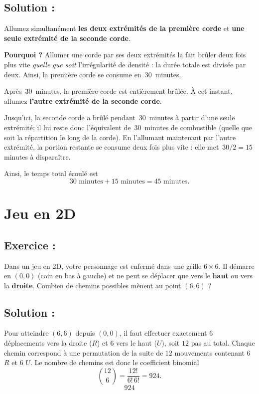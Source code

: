 \subsection*{Solution :}

Allumez simultanément \textbf{les deux extrémités de la première corde} et \textbf{une seule extrémité de la seconde corde}.  

\medskip
\noindent\textbf{Pourquoi ?}  
Allumer une corde par ses deux extrémités la fait brûler deux fois plus vite \emph{quelle que soit} l’irrégularité de densité : la durée totale est divisée par deux. Ainsi, la première corde se consume en \(\,30\,\) minutes.

\medskip
\noindent Après \(\,30\,\) minutes, la première corde est entièrement brûlée. À cet instant,
allumez \textbf{l’autre extrémité de la seconde corde}.  

Jusqu’ici, la seconde corde a brûlé pendant \(\,30\,\) minutes à partir d’une seule extrémité; il lui reste donc l’équivalent de \(\,30\,\) minutes de combustible (quelle que soit la répartition le long de la corde). En l’allumant maintenant par l’autre extrémité, la portion restante se consume deux fois plus vite : elle met \(\,30/2=15\,\) minutes à disparaître.

\medskip
\noindent Ainsi, le temps total écoulé est
\[
30 \text{ minutes} + 15 \text{ minutes} = \boxed{45 \text{ minutes}.}
\]


\section{Jeu en 2D}

\subsection*{Exercice :}

\begin{exerciseBox}[Jeu en 2D]
Dans un jeu en 2D, votre personnage est enfermé dans une grille \(6\times 6\).
Il démarre en \((0,0)\) (coin en bas à gauche) et ne peut se déplacer que vers le \textbf{haut}
ou vers la \textbf{droite}.  
Combien de chemins possibles mènent au point \((6,6)\) ?    
\end{exerciseBox}


\subsection*{Solution :}

Pour atteindre \((6,6)\) depuis \((0,0)\), il faut effectuer exactement
\(6\) déplacements vers la droite (\(R\)) et \(6\) vers le haut (\(U\)),
soit \(12\) pas au total.  
Chaque chemin correspond à une permutation de la suite de \(12\) mouvements
contenant \(6\) \(R\) et \(6\) \(U\).  
Le nombre de chemins est donc le coefficient binomial
\[
\binom{12}{6}=\frac{12!}{6!\,6!}=924.
\]
\[
\boxed{924}
\]

